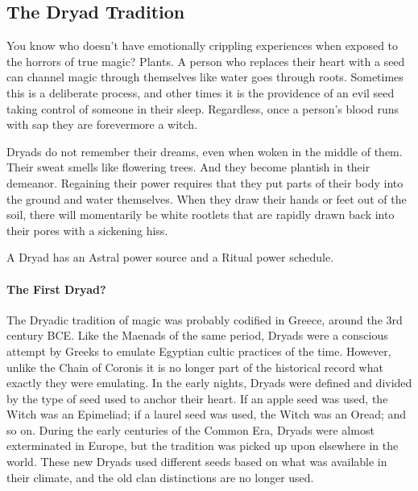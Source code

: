 \subsection[Dryad]{The Dryad Tradition} 

You know who doesn't have emotionally crippling experiences when exposed to the horrors of true magic? Plants. A person who replaces their heart with a seed can channel magic through themselves like water goes through roots. Sometimes this is a deliberate process, and other times it is the providence of an evil seed taking control of someone in their sleep. Regardless, once a person's blood runs with sap they are forevermore a witch.

Dryads do not remember their dreams, even when woken in the middle of them. Their sweat smells like flowering trees. And they become plantish in their demeanor. Regaining their power requires that they put parts of their body into the ground and water themselves. When they draw their hands or feet out of the soil, there will momentarily be white  rootlets that are rapidly drawn back into their pores with a sickening hiss.

A Dryad has an Astral power source and a Ritual power schedule.

\paragraph{The First Dryad?} The Dryadic tradition of magic was probably codified in Greece, around the 3rd century BCE. Like the Maenads of the same period, Dryads were a conscious attempt by Greeks to emulate Egyptian cultic practices of the time. However, unlike the Chain of Coronis it is no longer part of the historical record what exactly they were emulating. In the early nights, Dryads were defined and divided by the type of seed used to anchor their heart. If an apple seed was used, the Witch was an Epimeliad; if a laurel seed was used, the Witch was an Oread; and so on. During the early centuries of the Common Era, Dryads were almost exterminated in Europe, but the tradition was picked up upon elsewhere in the world. These new Dryads used different seeds based on what was available in their climate, and the old clan distinctions are no longer used.

